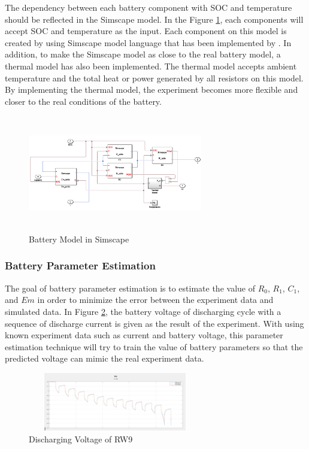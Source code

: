 The dependency between each battery component with SOC and temperature should be reflected in the Simscape model. In the Figure \ref{fig:battery_model_sim}, each components will accept SOC and temperature as the input. Each component on this model is created by using Simscape model language that has been implemented by \MATLAB. In addition, to make the Simscape model as close to the real battery model, a thermal model has also been implemented. The thermal model accepts ambient temperature and the total heat or power generated by all resistors on this model. By implementing the thermal model, the experiment becomes more flexible and closer to the real conditions of the battery.

\begin{figure}
\includegraphics[height=2in, width=3in]{figures/BatteryModelSimscape}
\caption{Battery Model in Simscape}
\label{fig:battery_model_sim}
\end{figure}

\subsubsection{Battery Parameter Estimation}

The goal of battery parameter estimation is to estimate the value of $R_0$, $R_1$, $C_1$, and $Em$ in order to minimize the error between the experiment data and simulated data. In Figure \ref{fig:discharging_voltage_RW9}, the battery voltage of discharging cycle with a sequence of discharge current is given as the result of the experiment. 
With using known experiment data such as current and battery voltage, this parameter estimation technique will try to train the value of battery parameters so that the predicted voltage can mimic the real experiment data.

\begin{figure}
\includegraphics[height=1in, width=3in]{figures/Discharging_01}
\caption{Discharging Voltage of RW9}
\label{fig:discharging_voltage_RW9}
\end{figure}

